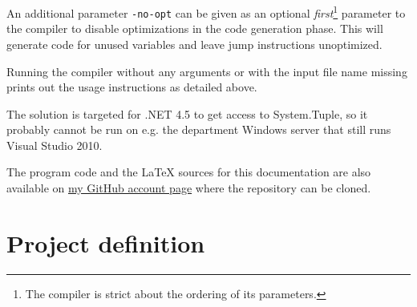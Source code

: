 \documentclass[a4paper,11pt]{article}
\begin{document}
An additional parameter \verb,-no-opt, can be given as an optional \emph{first}\footnote{The compiler is strict about the ordering of its parameters.} parameter to the compiler to disable optimizations in the code generation phase. This will generate code for unused variables and leave jump instructions unoptimized.

Running the compiler without any arguments or with the input file name missing prints out the usage instructions as detailed above.

The solution is targeted for .NET 4.5 to get access to System.Tuple, so it probably cannot be run on e.g. the department Windows server that still runs Visual Studio 2010.

The program code and the \LaTeX{} sources for this documentation are also available on \href{https://github.com/Lateks/MiniJavaCompiler}{my GitHub account page} where the repository can be cloned.


\appendix
\section{Project definition}
\end{document}
